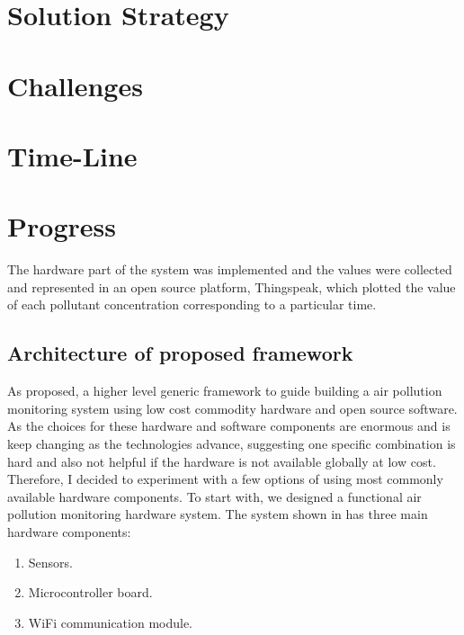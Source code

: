 \documentclass[10pt,a4paper]{report}
\begin{document}
\chapter{Solution Strategy}

\chapter{Challenges}

\chapter{Time-Line}

\chapter{Progress}

The hardware part of the system was implemented and the values were collected and represented in an open source platform, Thingspeak, which plotted the value of each pollutant concentration corresponding to a particular time.
\section{Architecture of proposed framework}
As proposed, a higher level generic framework to guide building a air pollution monitoring system using low cost commodity hardware and open source software. As the choices for these hardware and software components are enormous and is keep changing as the technologies advance, suggesting one specific combination is hard and also not helpful if the hardware is not available globally at low cost. Therefore, I decided to experiment with a few options of using most commonly available hardware components. To start with, we designed a functional air pollution monitoring hardware system.
The system shown in has three main hardware components:
\begin{enumerate}
\item  Sensors.
\item  Microcontroller board.
\item  WiFi communication module.
\end{enumerate}
\end{document}
